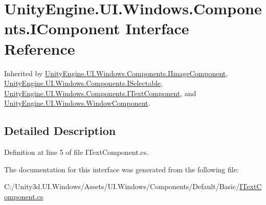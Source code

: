\hypertarget{interface_unity_engine_1_1_u_i_1_1_windows_1_1_components_1_1_i_component}{}\section{Unity\+Engine.\+U\+I.\+Windows.\+Components.\+I\+Component Interface Reference}
\label{interface_unity_engine_1_1_u_i_1_1_windows_1_1_components_1_1_i_component}


Inherited by \hyperlink{interface_unity_engine_1_1_u_i_1_1_windows_1_1_components_1_1_i_image_component}{Unity\+Engine.\+U\+I.\+Windows.\+Components.\+I\+Image\+Component}, \hyperlink{interface_unity_engine_1_1_u_i_1_1_windows_1_1_components_1_1_i_selectable}{Unity\+Engine.\+U\+I.\+Windows.\+Components.\+I\+Selectable}, \hyperlink{interface_unity_engine_1_1_u_i_1_1_windows_1_1_components_1_1_i_text_component}{Unity\+Engine.\+U\+I.\+Windows.\+Components.\+I\+Text\+Component}, and \hyperlink{class_unity_engine_1_1_u_i_1_1_windows_1_1_window_component}{Unity\+Engine.\+U\+I.\+Windows.\+Window\+Component}.



\subsection{Detailed Description}


Definition at line 5 of file I\+Text\+Component.\+cs.



The documentation for this interface was generated from the following file\+:\begin{DoxyCompactItemize}
\item 
C\+:/\+Unity3d.\+U\+I.\+Windows/\+Assets/\+U\+I.\+Windows/\+Components/\+Default/\+Basic/\hyperlink{_i_text_component_8cs}{I\+Text\+Component.\+cs}\end{DoxyCompactItemize}
